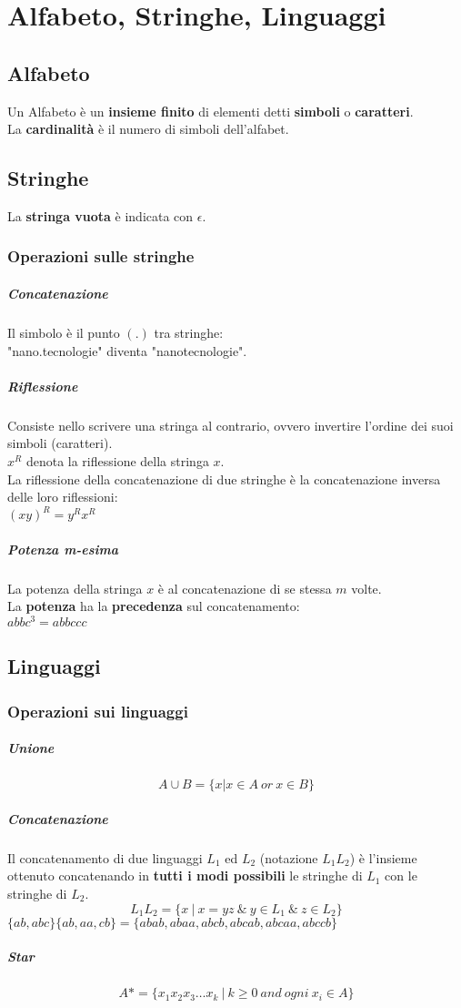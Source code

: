 \documentclass[14pt]{extarticle}
\begin{document}
\section{Alfabeto, Stringhe, Linguaggi}
\subsection{Alfabeto}
Un Alfabeto è un \textbf{insieme finito} di elementi detti \textbf{simboli} o \textbf{caratteri}.\\
La \textbf{cardinalità} è il numero di simboli dell'alfabet.
\subsection{Stringhe}
La \textbf{stringa vuota} è indicata con $\epsilon$.
\subsubsection{Operazioni sulle stringhe}
\subparagraph{Concatenazione}
Il simbolo è il punto $(.)$ tra stringhe:\\
"nano.tecnologie" diventa "nanotecnologie".
\subparagraph{Riflessione}
Consiste nello scrivere una stringa al contrario, ovvero invertire l'ordine dei suoi simboli (caratteri).\\
$x^R$ denota la riflessione della stringa $x$.\\
La riflessione della concatenazione di due stringhe è la concatenazione inversa delle loro riflessioni:\\
$(xy)^R=y^Rx^R$
\subparagraph{Potenza m-esima}
La potenza della stringa $x$ è al concatenazione di se stessa $m$ volte.\\
La \textbf{potenza} ha la \textbf{precedenza} sul concatenamento:\\
$abbc^3 = abbccc$
\subsection{Linguaggi}
\subsubsection{Operazioni sui linguaggi}
\subparagraph{Unione}
\begin{equation*}
    A\cup B = \{x|x\in A\ or\ x\in B\}
\end{equation*}
\subparagraph{Concatenazione}
Il concatenamento di due linguaggi $L_1$ ed $L_2$ (notazione $L_1L_2$) è l'insieme ottenuto
concatenando in \textbf{tutti i modi possibili} le stringhe di $L_1$ con le stringhe di $L_2$.
\begin{equation*}
    L_1L_2=\{x\ |\ x=yz\ \&\ y \in L_1\ \&\ z \in L_2\}
\end{equation*}
$\{ab,abc\}\{ab,aa,cb\}=\{abab,abaa,abcb,abcab,abcaa,abccb\}$
\subparagraph{Star}
\begin{equation*}
    A*=\{x_1x_2x_3\dots x_k\ |\ k\geq 0\ and\ ogni\ x_i \in A\}
\end{equation*}
\newpage
\end{document}
